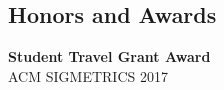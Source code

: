 \documentclass[line,11pt,letter]{/Users/longgong/Dropbox/git-reps/easy_cv/includes/cls/myRes}
\begin{document}
\begin{resume}
\section{Honors and Awards}
\vspace{-4pt}
{\setlength{\parskip}{0pt}
{\bf Student Travel Grant Award}\\
{\hspace*{1em} ACM SIGMETRICS \hfill 2017\break}
}



% 
\end{resume}
\end{document}
